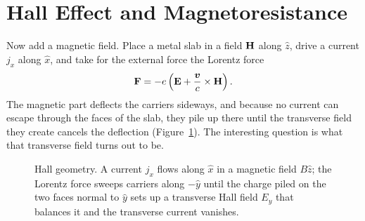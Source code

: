 \clearpage

\section{Hall Effect and Magnetoresistance}
\label{sec:drude-hall}

Now add a magnetic field. Place a metal slab in a field $\cvect{H}$ along $\hat{z}$, drive a current $j_x$ along $\hat{x}$, and take for the external force the Lorentz force
\begin{equation}
    \cvect{F} = -e\left(\cvect{E} + \frac{\lvect{v}}{c}\times\cvect{H}\right).
\end{equation}
The magnetic part deflects the carriers sideways, and because no current can escape through the faces of the slab, they pile up there until the transverse field they create cancels the deflection (Figure~\ref{fig:drude-hall}). The interesting question is what that transverse field turns out to be.

\begin{figure}[ht]
    \centering
    \caption{Hall geometry. A current $j_x$ flows along $\hat{x}$ in a magnetic field $B\hat{z}$; the Lorentz force sweeps carriers along $-\hat{y}$ until the charge piled on the two faces normal to $\hat{y}$ sets up a transverse Hall field $E_y$ that balances it and the transverse current vanishes.}
    \label{fig:drude-hall}
\end{figure}

